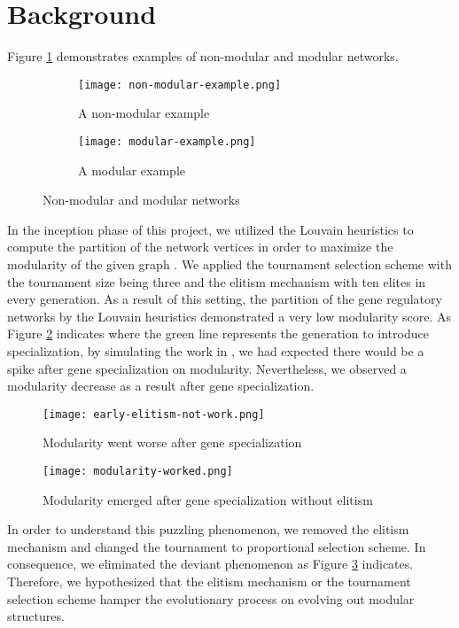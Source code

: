 \section{Background}
Figure \ref{fig:network-example} demonstrates examples of non-modular and modular networks.  
\begin{figure}[h!]
	\centering
	\begin{subfigure}[b]{0.45\linewidth}
		\texttt{[image: non-modular-example.png]}
		\caption{A non-modular example}
	\end{subfigure}
	\begin{subfigure}[b]{0.45\linewidth}
		\texttt{[image: modular-example.png]}
		\caption{A modular example}
	\end{subfigure}
	\caption{Non-modular and modular networks}
	\label{fig:network-example}
\end{figure}
In the inception phase of this project, we utilized the Louvain heuristics to compute the partition of the network vertices in order to maximize the modularity of the given graph \cite{blondel2008fast}. We applied the tournament selection scheme with the tournament size being three and the elitism mechanism with ten elites in every generation. As a result of this setting, the partition of the gene regulatory networks by the Louvain heuristics demonstrated a very low modularity score. As Figure \ref{fig:early-modularity-not-work} indicates where the green line represents the generation to introduce specialization, by simulating the work in \cite{espinosa2010specialization}, we had expected there would be a spike after gene specialization on modularity. Nevertheless, we observed a modularity decrease as a result after gene specialization. 
\begin{figure}[h!]
	\centering
	\texttt{[image: early-elitism-not-work.png]}
	\caption{Modularity went worse after gene specialization}
	\label{fig:early-modularity-not-work}
\end{figure}
\begin{figure}[h!]
	\centering
	\texttt{[image: modularity-worked.png]}
	\caption{Modularity emerged after gene specialization without elitism}
	\label{fig:modularity-worked-without-elitism}
\end{figure}
In order to understand this puzzling phenomenon, we removed the elitism mechanism and changed the tournament to proportional selection scheme. In consequence, we eliminated the deviant phenomenon as Figure \ref{fig:modularity-worked-without-elitism} indicates. Therefore, we hypothesized that the elitism mechanism or the tournament selection scheme hamper the evolutionary process on evolving out modular structures.
